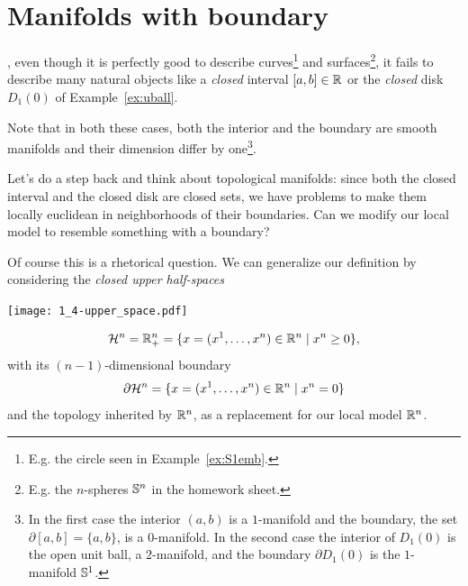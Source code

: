 \section{Manifolds with boundary}\label{sec:mbnd}

, even though it is perfectly good to describe curves\footnote{E.g. the circle seen in Example~\ref{ex:S1emb}.} and surfaces\footnote{E.g. the $n$-spheres $\mathbb{S}^n$ in the homework sheet.}, it fails to describe many natural objects like a \emph{closed} interval $[a,b]\in\mathbb{R}$ or the \emph{closed} disk $D_1(0)$ of Example~\ref{ex:uball}.

Note that in both these cases, both the interior and the boundary are smooth manifolds and their dimension differ by one\footnote{In the first case the interior $(a,b)$ is a $1$-manifold and the boundary, the set $\partial[a,b] = \{a,b\}$, is a $0$-manifold. In the second case the interior of $D_1(0)$ is the open unit ball, a $2$-manifold, and the boundary $\partial D_1(0)$ is the $1$-manifold $\mathbb{S}^1$.}.

Let's do a step back and think about topological manifolds: since both the closed interval and the closed disk are closed sets, we have problems to make them locally euclidean in neighborhoods of their boundaries.
Can we modify our local model to resemble something with a boundary?

Of course this is a rhetorical question.
We can generalize our definition by considering the \emph{closed upper half-spaces}
\begin{marginfigure}[2em]
  \texttt{[image: 1\_4-upper\_space.pdf]}
\end{marginfigure}
\begin{equation}
  \mathcal{H}^n = \mathbb{R}_+^n = \{x=(x^1, \ldots, x^n)\in\mathbb{R}^n\mid x^n \geq 0\},
\end{equation}
with its $(n-1)$-dimensional boundary
\begin{equation}
  \partial\mathcal{H}^n = \{x=(x^1, \ldots, x^n)\in\mathbb{R}^n\mid x^n = 0\}
\end{equation}
and the topology inherited by $\mathbb{R}^n$, as a replacement for our local model $\mathbb{R}^n$.

